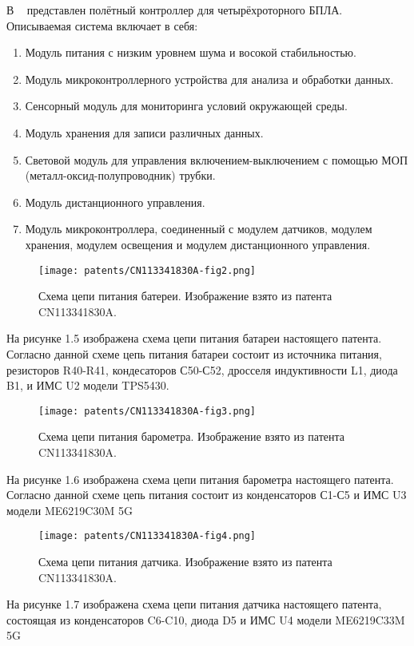 В ~\cite{CN113341830A} представлен полётный контроллер для
четырёхроторного БПЛА. Описываемая система включает в себя:
\begin{enumerate}
\item Модуль питания с низким уровнем шума и восокой стабильностью.
\item Модуль микроконтроллерного устройства для анализа и обработки данных.
\item Сенсорный модуль для мониторинга условий окружающей среды.
\item Модуль хранения для записи различных данных.
\item Световой модуль для управления включением-выключением с помощью МОП (металл-оксид-полупроводник) трубки.
\item Модуль дистанционного управления.  
\item Модуль микроконтроллера, соединенный с модулем датчиков, модулем
хранения, модулем освещения и модулем дистанционного управления.
\end{enumerate}

\begin{figure}[H]
  \centering
  \texttt{[image: patents/CN113341830A-fig2.png]}
  \caption{Схема цепи питания батереи. Изображение взято из патента CN113341830A.}
\end{figure}

На рисунке 1.5 изображена схема цепи питания батареи настоящего
патента.  Согласно данной схеме цепь питания батареи состоит из
источника питания, резисторов R40-R41, кондесаторов С50-С52, дросселя
индуктивности L1, диода B1, и ИМС U2 модели TPS5430.

\begin{figure}[H]
  \centering
  \texttt{[image: patents/CN113341830A-fig3.png]}
  \caption{Схема цепи питания барометра. Изображение взято из патента CN113341830A.}
\end{figure}

На рисунке 1.6 изображена схема цепи питания барометра настоящего патента.
Согласно данной схеме цепь питания состоит из конденсаторов С1-С5 и ИМС U3 модели
ME6219C30M 5G

\begin{figure}[H]
  \centering
  \texttt{[image: patents/CN113341830A-fig4.png]}
  \caption{Схема цепи питания датчика. Изображение взято из патента CN113341830A.}
\end{figure}

На рисунке 1.7 изображена схема цепи питания датчика настоящего
патента, состоящая из конденсаторов C6-C10, диода D5 и ИМС U4 модели
ME6219C33M 5G

